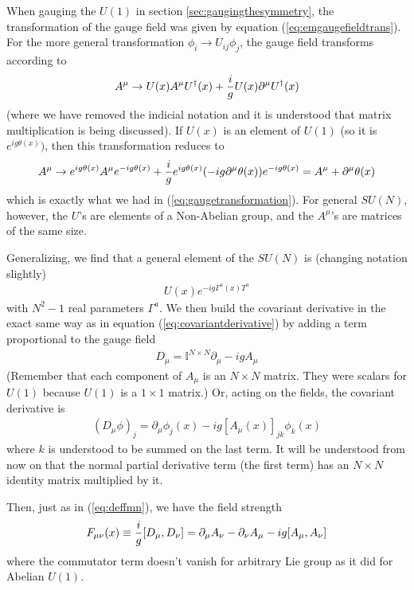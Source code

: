 \documentclass[12pt,epsf]{article}
\def\nolabel{\nonumber }
\def\nolabel{\nonumber }
\begin{document}
When gauging the $U(1)$ in section \ref{sec:gaugingthesymmetry}, the
transformation of the gauge field was given by equation
(\ref{eq:emgaugefieldtrans}).  For the more general transformation
$\phi_i \rightarrow U_{ij}\phi_j$, the gauge field transforms according
to
\begin{eqnarray}
A^{\mu} \rightarrow U(x)A^{\mu}U^{\dagger}(x) + {i \over
g}U(x)\partial^{\mu}U^{\dagger}(x)\nolabel
\end{eqnarray}
(where we have removed the indicial notation and it is understood that
matrix multiplication is being discussed).  If $U(x)$ is an element of
$U(1)$ (so it is $e^{ig\theta(x)})$, then this transformation reduces
to
\begin{eqnarray}
A^{\mu} \rightarrow e^{ig\theta(x)}A^{\mu}e^{-ig\theta(x)} + {i \over
g}e^{ig\theta(x)}(-ig\partial^{\mu}\theta(x))e^{-ig\theta(x)} =
A^{\mu}+\partial^{\mu}\theta(x)\nolabel
\end{eqnarray}
which is exactly what we had in (\ref{eq:gaugetransformation}).  For
general $SU(N)$, however, the $U$'s are elements of a Non-Abelian
group, and the $A^{\mu}$'s are matrices of the same size.  

Generalizing, we find that a general element of the $SU(N)$ is
(changing notation slightly)
\begin{eqnarray}
U(x)  e^{-ig\Gamma^a(x)T^a}\nolabel
\end{eqnarray}
with $N^2-1$ real parameters $\Gamma^a$.  We then build the covariant
derivative in the exact same way as in equation
(\ref{eq:covariantderivative}) by adding a term proportional to the
gauge field
\begin{eqnarray}
D_{\mu} = \mathbb{I}^{N\times N} \partial_{\mu} - igA_{\mu}\nolabel
\end{eqnarray}
(Remember that each component of $A_{\mu}$ is an $N\times N$ matrix. 
They were scalars for $U(1)$ because $U(1)$ is a $1\times 1$ matrix.) 
Or, acting on the fields, the covariant derivative is
\begin{eqnarray}
(D_{\mu}\phi)_j = \partial_{\mu}\phi_j(x) - ig[A_{\mu}(x)]_{jk}
\phi_k(x) \label{eq:newcovder}
\end{eqnarray}
where $k$ is understood to be summed on the last term.	It will be
understood from now on that the normal partial derivative term (the
first term) has an $N\times N$ identity matrix multiplied by it.  

Then, just as in (\ref{eq:deffmn}), we have the field strength
\begin{eqnarray}
F_{\mu \nu}(x) \equiv {i \over g}[D_{\mu},D_{\nu}] =
\partial_{\mu}A_{\nu} - \partial_{\nu}A_{\mu} - ig[A_{\mu},A_{\nu}]
\label{eq:secondiwant}
\end{eqnarray}
where the commutator term doesn't vanish for arbitrary Lie group as it
did for Abelian $U(1)$.  
\end{document}
